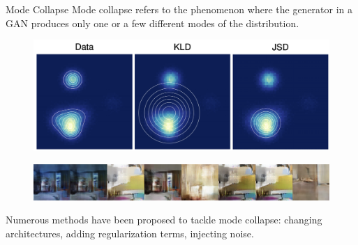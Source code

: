\documentclass{beamer}
\begin{document}
\begin{frame}{Mode Collapse}
	Mode collapse refers to the phenomenon where the generator in a GAN produces only one or a few different modes of the distribution.
	\vspace{-0.1cm}
	\begin{figure}
		\centering
		\includegraphics[width=0.75\linewidth]{figs/mode_collapse_1}
	\end{figure}
	\vspace{-0.3cm}
	\begin{figure}
		\centering
		\includegraphics[width=1.0\linewidth]{figs/mode_collapse_4}
	\end{figure}
	\eqpause
	Numerous methods have been proposed to tackle mode collapse: changing architectures, adding regularization terms, injecting noise.
\end{frame}
\end{document}
